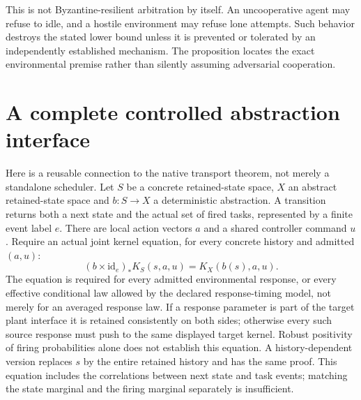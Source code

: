\documentclass[11pt]{article}
\begin{document}
This is not Byzantine-resilient arbitration by itself. An uncooperative agent may refuse to idle, and a hostile environment may refuse lone attempts. Such behavior destroys the stated lower bound unless it is prevented or tolerated by an independently established mechanism. The proposition locates the exact environmental premise rather than silently assuming adversarial cooperation.

\section{A complete controlled abstraction interface}
Here is a reusable connection to the native transport theorem, not merely a standalone scheduler. Let $S$ be a concrete retained-state space, $X$ an abstract retained-state space and $b:S\to X$ a deterministic abstraction. A transition returns both a next state and the actual set of fired tasks, represented by a finite event label $e$. There are local action vectors $a$ and a shared controller command $u$. Require an actual joint kernel equation, for every concrete history and admitted $(a,u)$:
\[
 (b\times\mathrm{id}_{e})_*K_S(s,a,u)
       =K_X(b(s),a,u).
\]
The equation is required for every admitted environmental response, or every effective conditional law allowed by the declared response-timing model, not merely for an averaged response law. If a response parameter is part of the target plant interface it is retained consistently on both sides; otherwise every such source response must push to the same displayed target kernel. Robust positivity of firing probabilities alone does not establish this equation. A history-dependent version replaces $s$ by the entire retained history and has the same proof. This equation includes the correlations between next state and task events; matching the state marginal and the firing marginal separately is insufficient.
\end{document}
